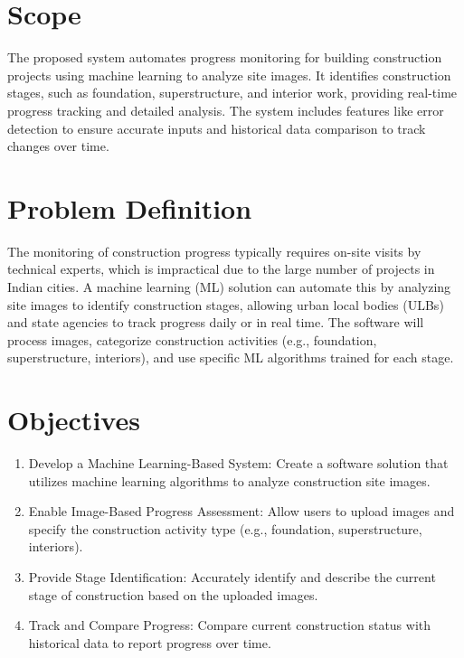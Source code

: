 \documentclass[12pt,a4paper]{report}
\begin{document}
\section{Scope}
\label{sec:scope-unique}
The proposed system automates progress monitoring for building construction projects using machine learning to analyze site images. It identifies construction stages, such as foundation, superstructure, and interior work, providing real-time progress tracking and detailed analysis. The system includes features like error detection to ensure accurate inputs and historical data comparison to track changes over time.

\section{Problem Definition}
\label{sec:problem-definition-unique}
The monitoring of construction progress typically requires on-site visits by technical experts, which is impractical due to the large number of projects in Indian cities. A machine learning (ML) solution can automate this by analyzing site images to identify construction stages, allowing urban local bodies (ULBs) and state agencies to track progress daily or in real time. The software will process images, categorize construction activities (e.g., foundation, superstructure, interiors), and use specific ML algorithms trained for each stage.

\section{Objectives}
\label{sec:objectives-unique}
\begin{enumerate}
    \item Develop a Machine Learning-Based System: Create a software solution that utilizes machine learning algorithms to analyze construction site images.
    \item Enable Image-Based Progress Assessment: Allow users to upload images and specify the construction activity type (e.g., foundation, superstructure, interiors).
    \item Provide Stage Identification: Accurately identify and describe the current stage of construction based on the uploaded images.
    \item Track and Compare Progress: Compare current construction status with historical data to report progress over time.
\end{enumerate}
\end{document}
